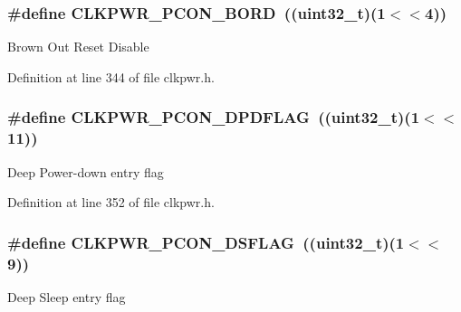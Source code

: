 \subsubsection[{\texorpdfstring{C\+L\+K\+P\+W\+R\+\_\+\+P\+C\+O\+N\+\_\+\+B\+O\+RD}{CLKPWR_PCON_BORD}}]{\setlength{\rightskip}{0pt plus 5cm}\#define C\+L\+K\+P\+W\+R\+\_\+\+P\+C\+O\+N\+\_\+\+B\+O\+RD~(({\bf uint32\+\_\+t})(1$<$$<$4))}\hypertarget{group___c_l_k_p_w_r___private___macros_gad932c8812ffd27c0e783a2169abb85ba}{}\label{group___c_l_k_p_w_r___private___macros_gad932c8812ffd27c0e783a2169abb85ba}
Brown Out Reset Disable 

Definition at line 344 of file clkpwr.\+h.

\subsubsection[{\texorpdfstring{C\+L\+K\+P\+W\+R\+\_\+\+P\+C\+O\+N\+\_\+\+D\+P\+D\+F\+L\+AG}{CLKPWR_PCON_DPDFLAG}}]{\setlength{\rightskip}{0pt plus 5cm}\#define C\+L\+K\+P\+W\+R\+\_\+\+P\+C\+O\+N\+\_\+\+D\+P\+D\+F\+L\+AG~(({\bf uint32\+\_\+t})(1$<$$<$11))}\hypertarget{group___c_l_k_p_w_r___private___macros_gac6ffbb5289e04f199c9b5e4596b745e8}{}\label{group___c_l_k_p_w_r___private___macros_gac6ffbb5289e04f199c9b5e4596b745e8}
Deep Power-\/down entry flag 

Definition at line 352 of file clkpwr.\+h.

\subsubsection[{\texorpdfstring{C\+L\+K\+P\+W\+R\+\_\+\+P\+C\+O\+N\+\_\+\+D\+S\+F\+L\+AG}{CLKPWR_PCON_DSFLAG}}]{\setlength{\rightskip}{0pt plus 5cm}\#define C\+L\+K\+P\+W\+R\+\_\+\+P\+C\+O\+N\+\_\+\+D\+S\+F\+L\+AG~(({\bf uint32\+\_\+t})(1$<$$<$9))}\hypertarget{group___c_l_k_p_w_r___private___macros_ga5039277ff3f9921e4dba4e4cf0763bf0}{}\label{group___c_l_k_p_w_r___private___macros_ga5039277ff3f9921e4dba4e4cf0763bf0}
Deep Sleep entry flag 

